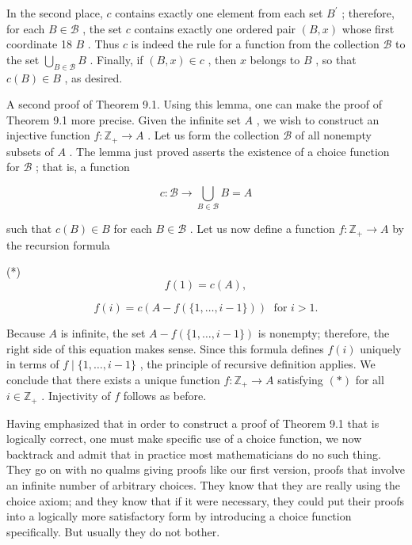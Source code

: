 \documentclass[10pt]{article}
\begin{document}
In the second place, \(c\) contains exactly one element from each set \({B}^{\prime }\) ; therefore, for each \(B \in  \mathcal{B}\) , the set \(c\) contains exactly one ordered pair \(\left( {B,x}\right)\) whose first coordinate 18 \(B\) . Thus \(c\) is indeed the rule for a function from the collection \(\mathcal{B}\) to the set \(\mathop{\bigcup }\limits_{{B \in  \mathcal{B}}}B\) . Finally, if \(\left( {B,x}\right)  \in  c\) , then \(x\) belongs to \(B\) , so that \(c\left( B\right)  \in  B\) , as desired.

A second proof of Theorem 9.1. Using this lemma, one can make the proof of Theorem 9.1 more precise. Given the infinite set \(A\) , we wish to construct an injective function \(f : {\mathbb{Z}}_{ + } \rightarrow  A\) . Let us form the collection \(\mathcal{B}\) of all nonempty subsets of \(A\) . The lemma just proved asserts the existence of a choice function for \(\mathcal{B}\) ; that is, a function

\[
c : \mathcal{B} \rightarrow  \mathop{\bigcup }\limits_{{B \in  \mathcal{B}}}B = A
\]

such that \(c\left( B\right)  \in  B\) for each \(B \in  \mathcal{B}\) . Let us now define a function \(f : {\mathbb{Z}}_{ + } \rightarrow  A\) by the recursion formula

(*)
\[
f\left( 1\right)  = c\left( A\right) ,
\]

\[
f\left( i\right)  = c\left( {A - f\left( {\{ 1,\ldots ,i - 1\} }\right) }\right) \;\text{ for }i > 1.
\]

Because \(A\) is infinite, the set \(A - f\left( {\{ 1,\ldots ,i - 1\} }\right)\) is nonempty; therefore, the right side of this equation makes sense. Since this formula defines \(f\left( i\right)\) uniquely in terms of \(f \mid  \{ 1,\ldots ,i - 1\}\) , the principle of recursive definition applies. We conclude that there exists a unique function \(f : {\mathbb{Z}}_{ + } \rightarrow  A\) satisfying \(\left( *\right)\) for all \(i \in  {\mathbb{Z}}_{ + }\) . Injectivity of \(f\) follows as before.

Having emphasized that in order to construct a proof of Theorem 9.1 that is logically correct, one must make specific use of a choice function, we now backtrack and admit that in practice most mathematicians do no such thing. They go on with no qualms giving proofs like our first version, proofs that involve an infinite number of arbitrary choices. They know that they are really using the choice axiom; and they know that if it were necessary, they could put their proofs into a logically more satisfactory form by introducing a choice function specifically. But usually they do not bother.
\end{document}

